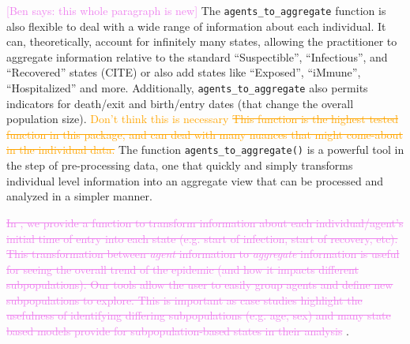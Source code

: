 \documentclass[
  shortnames]{jss}
\begin{document}
\textcolor{violet}{[Ben says: this whole paragraph is new]} The
\texttt{agents\_to\_aggregate} function is also flexible to deal with a
wide range of information about each individual. It can, theoretically,
account for infinitely many states, allowing the practitioner to
aggregate information relative to the standard ``Suspectible'',
``Infectious'', and ``Recovered'' states (CITE) or also add states like
``Exposed'', ``iMmune'', ``Hospitalized'' and more. Additionally,
\texttt{agents\_to\_aggregate} also permits indicators for death/exit
and birth/entry dates (that change the overall population size).
\textcolor{orange}{Don't think this is necessary \sout{This function is the highest tested function in this package, and can deal with many nuances that might come-about in the individual data.}}
The function \texttt{agents\_to\_aggregate()} is a powerful tool in the
step of pre-processing data, one that quickly and simply transforms
individual level information into an aggregate view that can be
processed and analyzed in a simpler manner.

\textcolor{violet}{\sout{In , we provide a function to transform information about each individual/agent’s initial time of entry into each state (e.g. start of infection, start of recovery, etc). This transformation between \textit{agent} information to \textit{aggregate} information is useful for seeing the overall trend of the epidemic (and how it impacts different subpopulations). Our tools allow the user to easily group agents and define new subpopulations to explore. This is important as case studies highlight the usefulness of identifying differing subpopulations (e.g. age, sex) and many state based models provide for subpopulation-based states in their analysis}}
\citep{rvachev1985,anderson1992,worby2015}.
\end{document}
